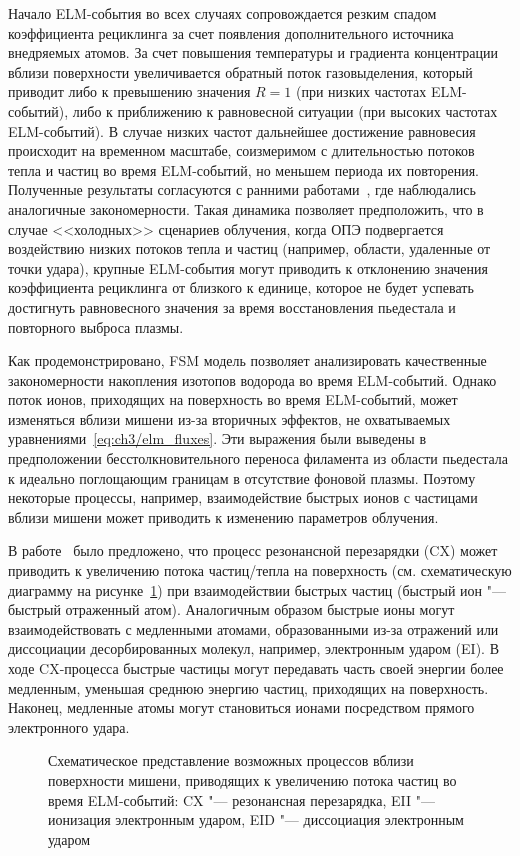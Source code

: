 Начало ELM-события во всех случаях сопровождается резким спадом коэффициента рециклинга за счет появления дополнительного источника внедряемых атомов. За счет повышения температуры и градиента концентрации вблизи поверхности увеличивается обратный поток газовыделения, который приводит либо к превышению значения \(R=1\) (при низких частотах ELM-событий), либо к приближению к равновесной ситуации (при высоких частотах ELM-событий). В случае низких частот дальнейшее достижение равновесия происходит на временном масштабе, соизмеримом с длительностью потоков тепла и частиц во время ELM-событий, но меньшем периода их повторения. Полученные результаты согласуются с ранними работами~\cite{Schmid2016,Smirnov2024}, где наблюдались аналогичные закономерности. Такая динамика позволяет предположить, что в случае <<холодных>> сценариев облучения, когда ОПЭ подвергается воздействию низких потоков тепла и частиц (например, области, удаленные от точки удара), крупные ELM-события могут приводить к отклонению значения коэффициента рециклинга от близкого к единице, которое не будет успевать достигнуть равновесного значения за время восстановления пьедестала и повторного выброса плазмы.  

Как продемонстрировано, FSM модель позволяет анализировать качественные закономерности накопления изотопов водорода во время ELM-событий. Однако поток ионов, приходящих на поверхность во время ELM-событий, может изменяться вблизи мишени из-за вторичных эффектов, не охватываемых уравнениями~\cref{eq:ch3/elm_fluxes}. Эти выражения были выведены в предположении бесстолкновительного переноса филамента из области пьедестала к идеально поглощающим границам в отсутствие фоновой плазмы. Поэтому некоторые процессы, например, взаимодействие быстрых ионов с частицами вблизи мишени может приводить к изменению параметров облучения.

В работе~\cite{Guillemaut2018} было предложено, что процесс резонансной перезарядки (CX) может приводить к увеличению потока частиц/тепла на поверхность (см. схематическую диаграмму на рисунке~\cref{fig:ch3/redeposition}) при взаимодействии быстрых частиц (быстрый ион "--- быстрый отраженный атом). Аналогичным образом быстрые ионы могут взаимодействовать с медленными атомами, образованными из-за отражений или диссоциации десорбированных молекул, например, электронным ударом (EI). В ходе CX-процесса быстрые частицы могут передавать часть своей энергии более медленным, уменьшая среднюю энергию частиц, приходящих на поверхность. Наконец, медленные атомы могут становиться ионами посредством прямого электронного удара. 
\begin{figure}[ht]
	\caption{Схематическое представление возможных процессов вблизи поверхности мишени, приводящих к увеличению потока частиц во время ELM-событий: CX "--- резонансная перезарядка, EII "--- ионизация электронным ударом, EID "--- диссоциация электронным ударом}\label{fig:ch3/redeposition}
\end{figure}

